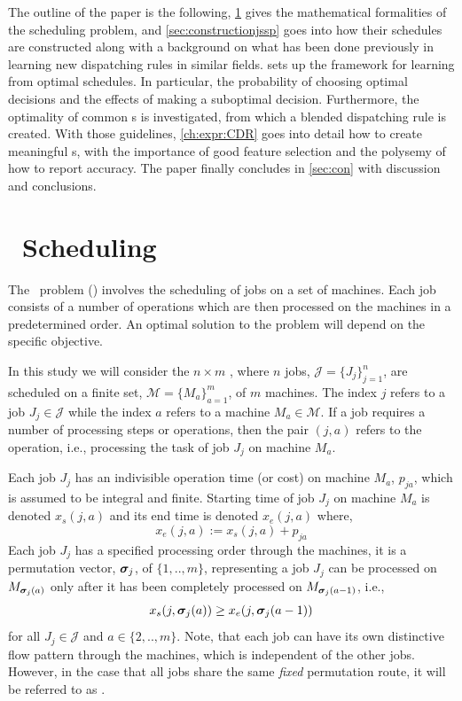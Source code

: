 \documentclass[smallextended]{svjour3}
\begin{document}
The outline of the paper is the following, \cref{sec:problemdef} gives the 
mathematical formalities of the scheduling problem, and  
\cref{sec:constructionjssp} goes into how their schedules are constructed along 
with a background on what has been done previously in learning new dispatching 
rules in similar fields. 
 sets up the framework for learning from optimal schedules. In 
particular, the probability of choosing optimal decisions and the effects of 
making a suboptimal decision. 
Furthermore, the optimality of common \dr s is investigated, from 
which a blended dispatching rule is created. 
With those guidelines, \cref{ch:expr:CDR} goes into detail how to create 
meaningful \cdr s, with the importance of good feature 
selection and the polysemy of how to report accuracy. 
The paper finally concludes in \cref{sec:con} with discussion and conclusions.


\section{\Jsp~Scheduling}\label{sec:problemdef}
The \jsp~problem (\JSP) involves the scheduling of jobs on a set of 
machines. Each job consists of a number of operations which are then processed 
on the machines in a predetermined order. An optimal solution to the problem 
will depend on the specific objective. 

In this study we will consider the $n\times m$ \JSP, where $n$ jobs, 
$\mathcal{J}=\{J_j\}_{j=1}^n$, are scheduled on a finite set, 
$\mathcal{M}=\{M_a\}_{a=1}^m$, of $m$ machines. The index $j$ refers to a job 
$J_j\in\mathcal{J}$ while the index  $a$ refers to a machine 
$M_a\in\mathcal{M}$. 
If a job requires a number of processing steps or operations, then the pair 
$(j,a)$ refers to the operation, i.e., processing the task of job $J_j$ on 
machine $M_a$. 

Each job $J_j$ has an indivisible operation time (or cost) on machine $M_a$, 
$p_{ja}$, which is assumed to be integral and finite. 
Starting time of job $J_j$ on machine $M_a$ is denoted $x_s(j,a)$ and its 
end time is denoted $x_e(j,a)$ where, 
\begin{equation}  x_e(j,a):=x_s(j,a)+p_{ja} \end{equation} 
Each job $J_j$ has a specified processing order through the machines, it is a 
permutation vector, $\bm \sigma_j$, of $\{1,..,m\}$, representing a job $J_j$ can 
be processed on $M_{\bm \sigma_j(a)}$ only after it has been completely processed 
on $M_{\bm \sigma_j(a-1)}$, i.e.,
\begin{equation}\label{eq:permutation}
x_s(j,\bm \sigma_j(a)) \geq x_e(j,\bm \sigma_j(a-1)) 
\end{equation}
for all $J_j\in\mathcal{J}$ and $a\in\{2,..,m\}$. 
Note, that each job can have its own distinctive flow pattern through the 
machines, which is independent of the other jobs. However, in the case that all 
jobs share the same \emph{fixed} permutation route, it will be referred to as 
\FSP.
\end{document}
